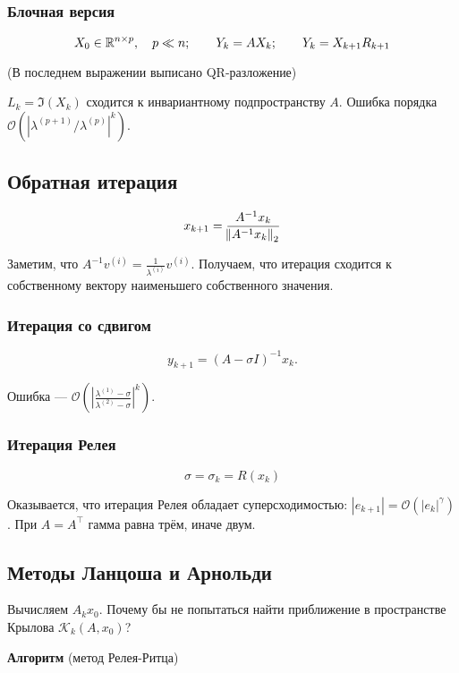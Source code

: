 \subsubsection{Блочная версия}

\[
    X_0 \in \mathbb{R}^{n \times p}, \quad p \ll n; \qquad
    Y_k = A X_k; \qquad
    Y_k = X_{k + 1} R_{k + 1}
\]

(В последнем выражении выписано QR-разложение)

$L_k = \Im (X_k)$ сходится к инвариантному подпространству $A$. Ошибка
порядка $\mathcal{O}(|\lambda^{(p + 1)} / \lambda^{(p)}|^k)$.

\subsection{Обратная итерация}

\[
    x_{k + 1} = \frac{A^{-1} x_k}{\norm{A^{-1} x_k}_2}
\]

Заметим, что $A^{-1} v^{(i)} = \frac{1}{\lambda^{(i)}} v^{(i)}$. Получаем, что
итерация сходится к собственному вектору наименьшего собственного значения.

\subsubsection{Итерация со сдвигом}

\[
    y_{k + 1} = (A - \sigma I)^{-1} x_k.
\]

Ошибка --- $\mathcal{O} \left( \left| \frac{\lambda^{(1)} - \sigma}
    {\lambda^{(2)} - \sigma} \right|^k \right)$.

\subsubsection{Итерация Релея}

\[
    \sigma = \sigma_k = R(x_k)
\]

Оказывается, что итерация Релея обладает суперсходимостью:
$|e_{k + 1}| = \mathcal{O}(|e_k|^\gamma)$. При $A = A^\top$ гамма равна трём,
иначе двум.

\subsection{Методы Ланцоша и Арнольди}

Вычисляем $A_k x_0$. Почему бы не попытаться найти приближение в пространстве
Крылова $\mathcal{K}_k(A, x_0)$?

\textbf{Алгоритм} (метод Релея-Ритца)

